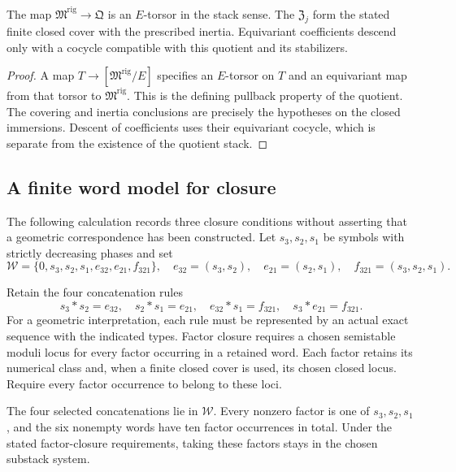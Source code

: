 \begin{proposition}
\label{prop:retained-e-translation-rigidifications}
\label{prop:retained-closed-substacks}
The map $\mathfrak M^{\mathrm{rig}}\to\mathfrak Q$ is an
$E$-torsor in the stack sense.  The $\mathfrak Z_j$ form the stated
finite closed cover with the prescribed inertia.  Equivariant coefficients descend only with
a cocycle compatible with this quotient and its stabilizers.
\end{proposition}

\begin{proof}
A map $T\to[\mathfrak M^{\mathrm{rig}}/E]$ specifies an $E$-torsor
on $T$ and an equivariant map from that torsor to
$\mathfrak M^{\mathrm{rig}}$.  This is the defining pullback property
of the quotient.  The covering and inertia conclusions are precisely
the hypotheses on the closed immersions.  Descent of coefficients
uses their equivariant cocycle, which is separate from the existence
of the quotient stack.
\end{proof}

\subsection{A finite word model for closure}

The following calculation records three closure conditions without
asserting that a geometric correspondence has been constructed.
Let $s_3,s_2,s_1$ be symbols with strictly decreasing phases and set
\[
\mathcal W=\{0,s_3,s_2,s_1,e_{32},e_{21},f_{321}\},
\quad e_{32}=(s_3,s_2),\quad e_{21}=(s_2,s_1),
\quad f_{321}=(s_3,s_2,s_1).
\]

\begin{definition}
\label{def:retained-extension-closure-datum}
\label{def:retained-hn-factor-closure-datum}
Retain the four concatenation rules
\[
s_3*s_2=e_{32},\quad s_2*s_1=e_{21},\quad
 e_{32}*s_1=f_{321},\quad s_3*e_{21}=f_{321}.
\]
For a geometric interpretation, each rule must be represented by an
actual exact sequence with the indicated types.  Factor closure
requires a chosen semistable moduli locus for every factor occurring
in a retained word.  Each factor retains its numerical class and,
when a finite closed cover is used, its chosen closed locus.
Require every factor occurrence to belong to these loci.
\end{definition}

\begin{proposition}
\label{prop:retained-extension-closure}
\label{prop:retained-hn-factor-closure}
The four selected concatenations lie in $\mathcal W$.  Every nonzero
factor is one of $s_3,s_2,s_1$, and the six nonempty words have ten
factor occurrences in total.  Under the stated factor-closure
requirements, taking these factors stays in the chosen substack
system.
\end{proposition}

